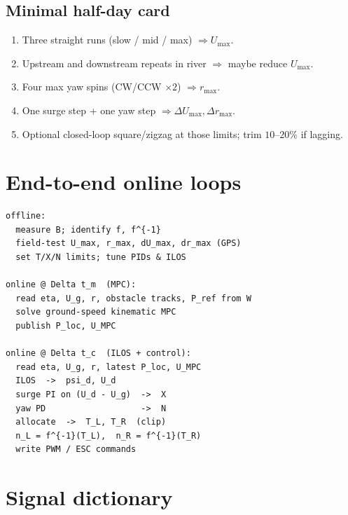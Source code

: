 \documentclass[11pt,a4paper]{article}
\begin{document}
\subsection{Minimal half-day card}
\begin{enumerate}
  \item Three straight runs (slow / mid / max) \(\Rightarrow U_{\max}\).
  \item Upstream and downstream repeats in river \(\Rightarrow\) maybe reduce \(U_{\max}\).
  \item Four max yaw spins (CW/CCW \(\times 2\)) \(\Rightarrow r_{\max}\).
  \item One surge step + one yaw step \(\Rightarrow \Delta U_{\max},\Delta r_{\max}\).
  \item Optional closed-loop square/zigzag at those limits; trim \(10\)--\(20\%\) if lagging.
\end{enumerate}

\section{End-to-end online loops}

\begin{lstlisting}
offline:
  measure B; identify f, f^{-1}
  field-test U_max, r_max, dU_max, dr_max (GPS)
  set T/X/N limits; tune PIDs & ILOS

online @ Delta t_m  (MPC):
  read eta, U_g, r, obstacle tracks, P_ref from W
  solve ground-speed kinematic MPC
  publish P_loc, U_MPC

online @ Delta t_c  (ILOS + control):
  read eta, U_g, r, latest P_loc, U_MPC
  ILOS  ->  psi_d, U_d
  surge PI on (U_d - U_g)  ->  X
  yaw PD                   ->  N
  allocate  ->  T_L, T_R  (clip)
  n_L = f^{-1}(T_L),  n_R = f^{-1}(T_R)
  write PWM / ESC commands
\end{lstlisting}

\section{Signal dictionary}
\end{document}
